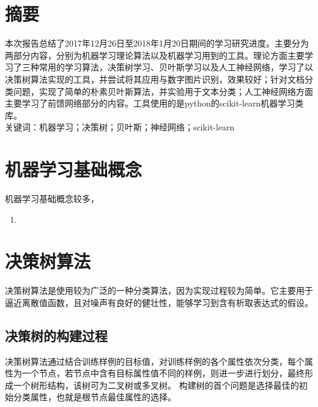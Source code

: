 \documentclass[a4papper]{article}
\title{}
\author{
Wu You\\ 
}
\begin{document}
\maketitle
\section*{摘要}
本次报告总结了2017年12月26日至2018年1月20日期间的学习研究进度。主要分为两部分内容，分别为机器学习理论算法以及机器学习用到的工具。理论方面主要学习了三种常用的学习算法，决策树学习、贝叶斯学习以及人工神经网络，学习了以决策树算法实现的工具，并尝试将其应用与数字图片识别，效果较好；针对文档分类问题，实现了简单的朴素贝叶斯算法，并实验用于文本分类；人工神经网络方面主要学习了前馈网络部分的内容。工具使用的是python的scikit-learn机器学习类库。\\
关键词：机器学习；决策树；贝叶斯；神经网络；scikit-learn

\newpage
\tableofcontents
\thispagestyle{empty}%
\newpage
\setcounter{page}{1}%
\setcounter{section}{0}%
\section{机器学习基础概念}
机器学习基础概念较多，
\begin{enumerate}
\item  
\end{enumerate}
\section{决策树算法}
决策树算法是使用较为广泛的一种分类算法，因为实现过程较为简单。它主要用于逼近离散值函数，且对噪声有良好的健壮性，能够学习到含有析取表达式的假设。
\subsection{决策树的构建过程}
\par\setlength{\parindent}{2em} %
决策树算法通过结合训练样例的目标值，对训练样例的各个属性依次分类，每个属性为一个节点，若节点中含有目标属性值不同的样例，则进一步进行划分，最终形成一个树形结构，该树可为二叉树或多叉树。
构建树的首个问题是选择最佳的初始分类属性，也就是根节点最佳属性的选择。
\end{document}
